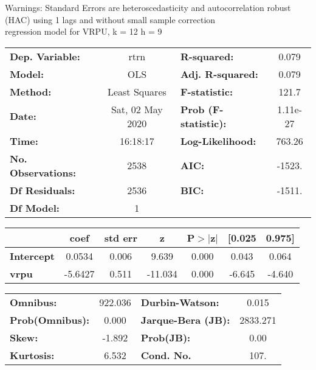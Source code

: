 Warnings: \newline
 [1] Standard Errors are heteroscedasticity and autocorrelation robust (HAC) using 1 lags and without small sample correction\\ 

regression model for VRPU, k = 12 h = 9\begin{center}
\begin{tabular}{lclc}
\toprule
\textbf{Dep. Variable:}    &       rtrn       & \textbf{  R-squared:         } &     0.079   \\
\textbf{Model:}            &       OLS        & \textbf{  Adj. R-squared:    } &     0.079   \\
\textbf{Method:}           &  Least Squares   & \textbf{  F-statistic:       } &     121.7   \\
\textbf{Date:}             & Sat, 02 May 2020 & \textbf{  Prob (F-statistic):} &  1.11e-27   \\
\textbf{Time:}             &     16:18:17     & \textbf{  Log-Likelihood:    } &    763.26   \\
\textbf{No. Observations:} &        2538      & \textbf{  AIC:               } &    -1523.   \\
\textbf{Df Residuals:}     &        2536      & \textbf{  BIC:               } &    -1511.   \\
\textbf{Df Model:}         &           1      & \textbf{                     } &             \\
\bottomrule
\end{tabular}
\begin{tabular}{lcccccc}
                   & \textbf{coef} & \textbf{std err} & \textbf{z} & \textbf{P$> |$z$|$} & \textbf{[0.025} & \textbf{0.975]}  \\
\midrule
\textbf{Intercept} &       0.0534  &        0.006     &     9.639  &         0.000        &        0.043    &        0.064     \\
\textbf{vrpu}      &      -5.6427  &        0.511     &   -11.034  &         0.000        &       -6.645    &       -4.640     \\
\bottomrule
\end{tabular}
\begin{tabular}{lclc}
\textbf{Omnibus:}       & 922.036 & \textbf{  Durbin-Watson:     } &    0.015  \\
\textbf{Prob(Omnibus):} &   0.000 & \textbf{  Jarque-Bera (JB):  } & 2833.271  \\
\textbf{Skew:}          &  -1.892 & \textbf{  Prob(JB):          } &     0.00  \\
\textbf{Kurtosis:}      &   6.532 & \textbf{  Cond. No.          } &     107.  \\
\bottomrule
\end{tabular}
\end{center}

